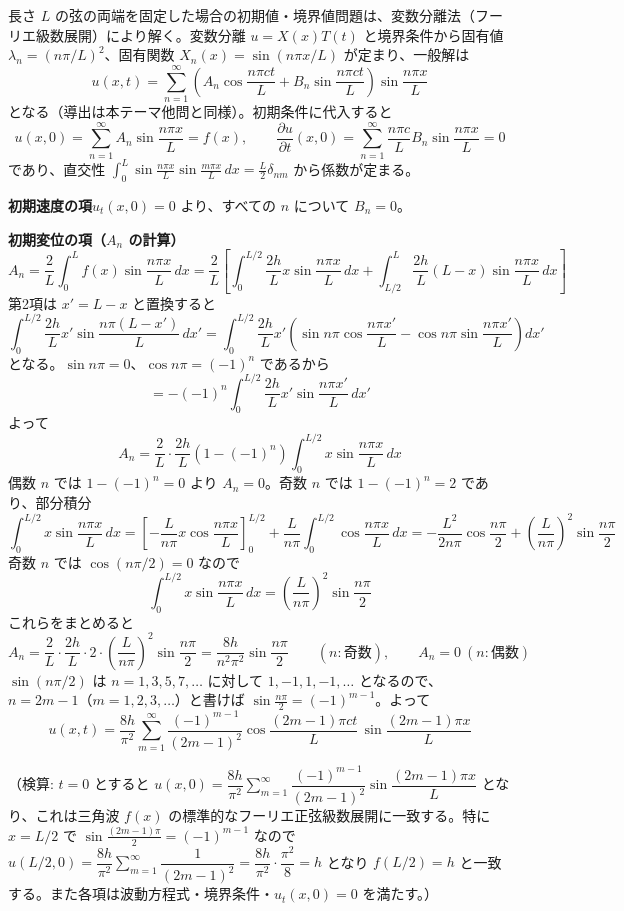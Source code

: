 
長さ $L$ の弦の両端を固定した場合の初期値・境界値問題は、変数分離法（フーリエ級数展開）により解く。変数分離 $u=X(x)T(t)$ と境界条件から固有値 $\lambda_n=(n\pi/L)^2$、固有関数 $X_n(x)=\sin(n\pi x/L)$ が定まり、一般解は
\[
u(x,t) = \sum_{n=1}^{\infty}\left(A_{n}\cos\frac{n\pi c t}{L} + B_{n}\sin\frac{n\pi c t}{L}\right)\sin\frac{n\pi x}{L}
\]
となる（導出は本テーマ他問と同様）。初期条件に代入すると
\[
u(x,0) = \sum_{n=1}^{\infty} A_{n}\sin\frac{n\pi x}{L} = f(x), \qquad
\frac{\partial u}{\partial t}(x,0) = \sum_{n=1}^{\infty} \frac{n\pi c}{L}B_{n}\sin\frac{n\pi x}{L} = 0
\]
であり、直交性 $\displaystyle\int_{0}^{L}\sin\frac{n\pi x}{L}\sin\frac{m\pi x}{L}\,dx = \frac{L}{2}\delta_{nm}$ から係数が定まる。

\medskip
\noindent
\textbf{初期速度の項}\quad $u_{t}(x,0)=0$ より、すべての $n$ について $B_{n}=0$。

\medskip
\noindent
\textbf{初期変位の項（$A_n$ の計算）}\quad
\[
A_{n} = \frac{2}{L}\int_{0}^{L} f(x)\sin\frac{n\pi x}{L}\,dx
= \frac{2}{L}\left[\int_{0}^{L/2}\frac{2h}{L}x\sin\frac{n\pi x}{L}\,dx + \int_{L/2}^{L}\frac{2h}{L}(L-x)\sin\frac{n\pi x}{L}\,dx\right]
\]
第2項は $x' = L-x$ と置換すると
\[
\int_{0}^{L/2}\frac{2h}{L}x'\sin\frac{n\pi(L-x')}{L}\,dx'
= \int_{0}^{L/2}\frac{2h}{L}x'\left(\sin n\pi\cos\frac{n\pi x'}{L} - \cos n\pi\sin\frac{n\pi x'}{L}\right)dx'
\]
となる。$\sin n\pi = 0$、$\cos n\pi = (-1)^{n}$ であるから
\[
= -(-1)^{n}\int_{0}^{L/2}\frac{2h}{L}x'\sin\frac{n\pi x'}{L}\,dx'
\]
よって
\[
A_{n} = \frac{2}{L}\cdot\frac{2h}{L}\left(1-(-1)^{n}\right)\int_{0}^{L/2} x\sin\frac{n\pi x}{L}\,dx
\]
偶数 $n$ では $1-(-1)^n=0$ より $A_{n}=0$。奇数 $n$ では $1-(-1)^{n}=2$ であり、部分積分
\[
\int_{0}^{L/2} x\sin\frac{n\pi x}{L}\,dx
= \left[-\frac{L}{n\pi}x\cos\frac{n\pi x}{L}\right]_{0}^{L/2} + \frac{L}{n\pi}\int_{0}^{L/2}\cos\frac{n\pi x}{L}\,dx
= -\frac{L^{2}}{2n\pi}\cos\frac{n\pi}{2} + \left(\frac{L}{n\pi}\right)^{2}\sin\frac{n\pi}{2}
\]
奇数 $n$ では $\cos(n\pi/2)=0$ なので
\[
\int_{0}^{L/2} x\sin\frac{n\pi x}{L}\,dx = \left(\frac{L}{n\pi}\right)^{2}\sin\frac{n\pi}{2}
\]
これらをまとめると
\[
A_{n} = \frac{2}{L}\cdot\frac{2h}{L}\cdot 2 \cdot \left(\frac{L}{n\pi}\right)^{2}\sin\frac{n\pi}{2} = \frac{8h}{n^{2}\pi^{2}}\sin\frac{n\pi}{2}
\qquad (n:\text{奇数}),\qquad A_{n}=0\ (n:\text{偶数})
\]
$\sin(n\pi/2)$ は $n=1,3,5,7,\dots$ に対して $1,-1,1,-1,\dots$ となるので、$n=2m-1$（$m=1,2,3,\dots$）と書けば $\sin\frac{n\pi}{2} = (-1)^{m-1}$。よって
\[
\boxed{\;
u(x,t) = \frac{8h}{\pi^{2}}\sum_{m=1}^{\infty}\frac{(-1)^{m-1}}{(2m-1)^{2}}\cos\frac{(2m-1)\pi c t}{L}\,\sin\frac{(2m-1)\pi x}{L}
\;}
\]

（検算: $t=0$ とすると $u(x,0) = \dfrac{8h}{\pi^{2}}\sum_{m=1}^{\infty}\dfrac{(-1)^{m-1}}{(2m-1)^{2}}\sin\dfrac{(2m-1)\pi x}{L}$ となり、これは三角波 $f(x)$ の標準的なフーリエ正弦級数展開に一致する。特に $x=L/2$ で $\sin\frac{(2m-1)\pi}{2}=(-1)^{m-1}$ なので $u(L/2,0) = \dfrac{8h}{\pi^2}\sum_{m=1}^\infty \dfrac{1}{(2m-1)^2} = \dfrac{8h}{\pi^2}\cdot\dfrac{\pi^2}{8} = h$ となり $f(L/2)=h$ と一致する。また各項は波動方程式・境界条件・$u_t(x,0)=0$ を満たす。）
